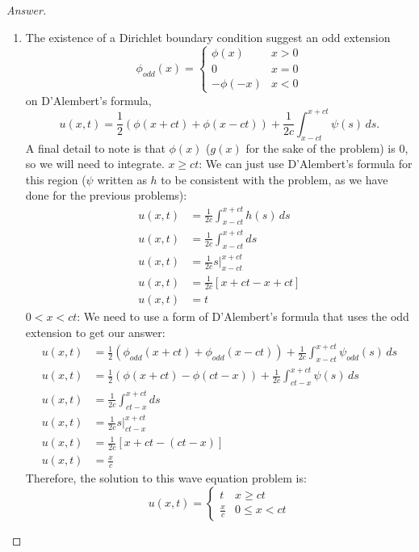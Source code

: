 \documentclass{article}
\theoremstyle{definition}
\renewcommand\qedsymbol{$\blacksquare$}
\newenvironment{ans}{\begin{proof}[Answer]\renewcommand{\qedsymbol}{}}{\end{proof}}
\begin{document}
\begin{ans}
\begin{enumerate}[(1), start=9]
    \item The existence of a Dirichlet boundary condition suggest an odd extension
    \[\phi_{odd}(x) = \begin{cases}
        \phi(x) & x > 0\\
        0 & x = 0\\
        -\phi(-x) & x < 0
    \end{cases}\]
    on D'Alembert's formula,
    \[u(x,t) = \frac{1}{2}(\phi(x+ct) + \phi(x-ct)) + \frac{1}{2c}\int_{x-ct}^{x+ct}\psi(s)\,ds.\]
    A final detail to note is that $\phi(x)$ ($g(x)$ for the sake of the problem) is $0$, so we will need to integrate.
    \underline{$x \geq ct$}: We can just use D'Alembert's formula for this region ($\psi$ written as $h$ to be consistent with the problem, as we have done for the previous problems):
    \begin{align*}
        u(x,t)&= \frac{1}{2c}\int_{x-ct}^{x+ct}h(s)\,ds\\
        u(x,t)&= \frac{1}{2c}\int_{x-ct}^{x+ct}ds\\
        u(x,t)&= \frac{1}{2c}s|_{x-ct}^{x+ct}\\
        u(x,t)&= \frac{1}{2c}[x+ct-x+ct]\\
        u(x,t)&= t
    \end{align*}
    \underline{$0 < x < ct$}: We need to use a form of D'Alembert's formula that uses the odd extension to get our answer:
    \begin{align*}
            u(x,t) &= \frac{1}{2}(\phi_{odd}(x+ct) + \phi_{odd}(x-ct)) + \frac{1}{2c}\int_{x-ct}^{x+ct}\psi_{odd}(s)\,ds\\
            u(x,t) &= \frac{1}{2}(\phi(x+ct) - \phi(ct-x)) + \frac{1}{2c}\int_{ct-x}^{x+ct}\psi(s)\,ds\\
            u(x,t) &= \frac{1}{2c}\int_{ct-x}^{x+ct}ds\\
            u(x,t) &= \frac{1}{2c}s|_{ct-x}^{x+ct}\\
            u(x,t) &= \frac{1}{2c}[x+ct - (ct-x)]\\
            u(x,t) &= \frac{x}{c}
    \end{align*}
    Therefore, the solution to this wave equation problem is:
    \[\boxed{u(x,t) = \begin{cases}
        t & x \geq ct\\
        \frac{x}{c} & 0 \leq x < ct
    \end{cases}}\]
\end{enumerate}
\end{ans}
\end{document}
